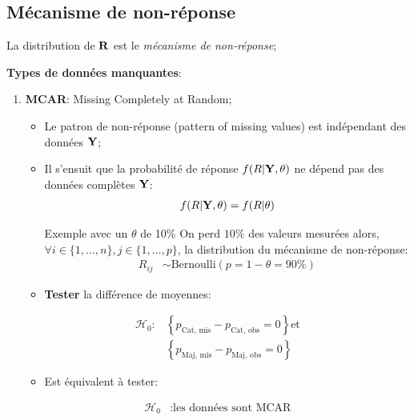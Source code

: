 \documentclass[10pt, french]{article}
\begin{document}
\begin{multicols*}{3}
\subsection*{Mécanisme de non-réponse}
La distribution de $\mathbf{R}$ est le \textit{mécanisme de non-réponse};

\textbf{Types de données manquantes}:
\begin{enumerate}[leftmargin = *]
	\item	\textbf{MCAR}: Missing Completely at Random;
		\begin{itemize}[leftmargin = *]
		\item	Le patron de non-réponse (pattern of missing values) est indépendant des données $\mathbf{Y}$;
		\item	Il s'ensuit que la probabilité de réponse $f(R | \mathbf{Y}, \theta)$ ne dépend pas des données complètes $\mathbf{Y}$:
			\begin{align*}
			f(R | \mathbf{Y}, \theta) &= f(R | \theta) \\
			\end{align*}
		\begin{examplebox}{Exemple avec un $\theta$ de 10\%}
		On perd $10\%$ des valeurs mesurées alors, $\forall i \in \{1, \dots, n\}, j \in \{1, \dots, p\}$, la distribution du mécanisme de non-réponse:
		\setlength{\mathindent}{-1cm}
			\begin{align*}
			R_{ij} 
			&\sim 	\text{Bernoulli}(p = 1 - \theta =  90\%)
			\end{align*}
		\setlength{\mathindent}{1cm}
		\end{examplebox}
		\item	\textbf{Tester} la différence de moyennes:
		\end{itemize}	
		\setlength{\mathindent}{-2cm}
			\begin{align*}
			\mathcal{H}_{0}:
			&\left\{ p_{\text{Cat, mis}} - p_{\text{Cat, obs}} = 0 \right\} 
			\text{et}	\\
			&\left\{ p_{\text{Maj, mis}} - p_{\text{Maj, obs}} = 0 \right\}
			\end{align*}
		\setlength{\mathindent}{1cm}
		\begin{itemize}[leftmargin = *]
		\item[]	Est équivalent à tester: 
		\end{itemize}	
		\setlength{\mathindent}{-2cm}
			\begin{align*}
			\mathcal{H}_{0}
			&:	\text{les données sont MCAR}
			\end{align*}

\end{enumerate}
\end{multicols*}
\end{document}

